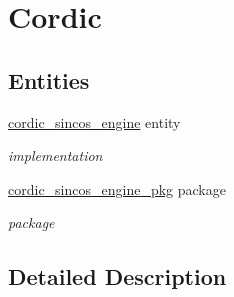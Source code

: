 \hypertarget{group__cordic}{}\section{Cordic}
\label{group__cordic}
\subsection*{Entities}
\begin{DoxyCompactItemize}
\item 
\hyperlink{classcordic__sincos__engine}{cordic\+\_\+sincos\+\_\+engine} entity
\begin{DoxyCompactList}\small\item\em implementation \end{DoxyCompactList}\item 
\hyperlink{classcordic__sincos__engine__pkg}{cordic\+\_\+sincos\+\_\+engine\+\_\+pkg} package
\begin{DoxyCompactList}\small\item\em package \end{DoxyCompactList}\end{DoxyCompactItemize}


\subsection{Detailed Description}
